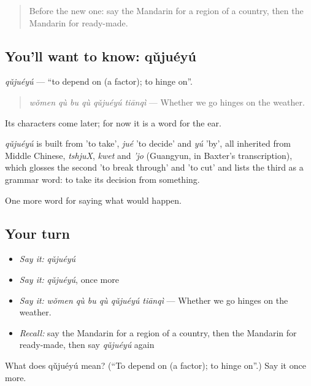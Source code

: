 \label{lesson:ZH-C398-qujueyu}



\begin{quote}
Before the new one: say the Mandarin for a region of a country, then the Mandarin for ready-made.
\end{quote}

\subsection*{You'll want to know: qǔjuéyú}
\emph{qǔjuéyú} — \textquotedblleft{}to depend on (a factor); to hinge on\textquotedblright{}.

\begin{quote}
\emph{wǒmen qù bu qù qǔjuéyú tiānqì} — Whether we go hinges on the weather.
\end{quote}

Its characters come later; for now it is a word for the ear.

\begin{cousinweb}
\emph{qǔjuéyú} is built from  'to take', \emph{jué} 'to decide' and \emph{yú} 'by', all inherited from Middle Chinese, \emph{tshjuX}, \emph{kwet} and \emph{'jo} (Guangyun, in Baxter's transcription), which glosses the second 'to break through' and 'to cut' and lists the third as a grammar word: to take its decision from something.
\end{cousinweb}

\begin{grammarlens}[title={What you've built}]
One more word for saying what would happen.
\end{grammarlens}

\subsection*{Your turn}
\begin{itemize}
\raggedright
  \item \emph{Say it:} \emph{qǔjuéyú}
  \item \emph{Say it:} \emph{qǔjuéyú}, once more
  \item \emph{Say it:} \emph{wǒmen qù bu qù qǔjuéyú tiānqì} — Whether we go hinges on the weather.
  \item \emph{Recall:} say the Mandarin for a region of a country, then the Mandarin for ready-made, then say \emph{qǔjuéyú} again
\end{itemize}

\begin{tcolorbox}[breakable,colback=teal!4,colframe=teal!35!black,title={Before you move on}]
What does qǔjuéyú mean? (\textquotedblleft{}To depend on (a factor); to hinge on\textquotedblright{}.) Say it once more.
\end{tcolorbox}
